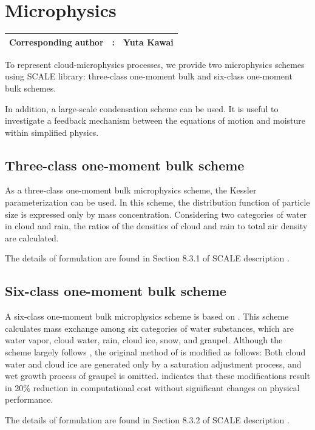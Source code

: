 \section{Microphysics}\label{sec:microphys}
{\bf \Large
\begin{tabular}{ccc}
\hline
  Corresponding author & : & Yuta Kawai\\
\hline
\end{tabular}
}

To represent cloud-microphysics processes, 
we provide two microphysics schemes using SCALE library: 
three-class one-moment bulk and six-class one-moment bulk schemes.

In addition, 
a large-scale condensation scheme can be used. 
It is useful to investigate a feedback mechanism between the equations of motion and moisture within simplified physics.

\subsection{Three-class one-moment bulk scheme}
As a three-class one-moment bulk microphysics scheme, 
the Kessler parameterization \citep{kessler_1969} can be used. 
In this scheme, 
the distribution function of particle size is expressed only by mass concentration. 
Considering two categories of water in cloud and rain, 
the ratios of the densities of cloud and rain to total air density are calculated.

The details of formulation are found in Section 8.3.1 of SCALE description \citep{scale_library}.

\subsection{Six-class one-moment bulk scheme}
A six-class one-moment bulk microphysics scheme is based on \citet{tomita_2008}. 
This scheme calculates mass exchange among six categories of water substances, 
which are water vapor, cloud water, rain, cloud ice, snow, and graupel.  
Although the scheme largely follows \citet{lin_etal_1983}, 
the original method of \citet{lin_etal_1983} is modified as follows: 
Both cloud water and cloud ice are generated only by a saturation adjustment process, 
and wet growth process of graupel is omitted.
\citet{tomita_2008} indicates that these modifications result in 20\% reduction in computational cost 
without significant changes on physical performance.

The details of formulation are found in Section 8.3.2 of SCALE description \citep{scale_library}.


